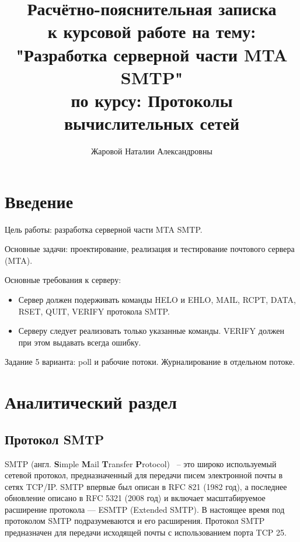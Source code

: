 \documentclass[a4paper,12pt]{report}
\title{Расчётно-пояснительная записка \\  к курсовой работе на тему: \\ "Разработка серверной части  MTA SMTP" \\ по курсу: Протоколы вычислительных сетей}
\author{Жаровой Наталии Александровны\newline}
\begin{document}
\maketitle

\tableofcontents

\chapter*{Введение}

Цель работы: разработка серверной части MTA SMTP.

Основные задачи: проектирование, реализация и тестирование почтового сервера
(MTA).

Основные требования к серверу: 
\begin{itemize}
\item Сервер должен подерживать команды HELO и EHLO, MAIL, RCPT, DATA, RSET,
QUIT, VERIFY протокола SMTP. 
\item Серверу следует реализовать только указанные команды. VERIFY должен при этом
выдавать всегда ошибку.
\end{itemize}

Задание 5 варианта: poll и рабочие потоки. Журналирование в
отдельном потоке.

%

\chapter{Аналитический раздел}

\section{Протокол SMTP}

SMTP (англ. \textbf{S}imple \textbf{M}ail \textbf{T}ransfer \textbf{P}rotocol) ~-- это широко используемый сетевой протокол, предназначенный для передачи писем электронной почты в сетях TCP/IP. SMTP впервые был описан в RFC 821 (1982 год), а последнее обновление описано в RFC 5321 (2008 год) и включает масштабируемое расширение протокола — ESMTP (Extended SMTP). В настоящее время под протоколом SMTP подразумеваются и его расширения. Протокол SMTP предназначен для передачи исходящей почты с использованием порта TCP 25.
\end{document}
